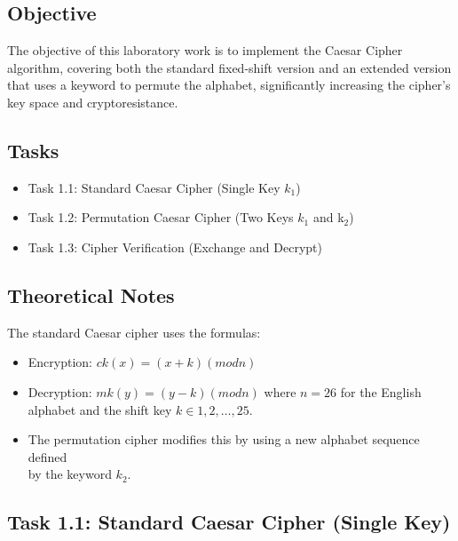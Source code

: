 \documentclass[a4paper,12pt]{article}
\begin{document}
\subsection{Objective}
\label{sec:orgf6ae595}
The objective of this laboratory work is to implement the Caesar Cipher algorithm, covering both the standard fixed-shift version and an extended version that uses a keyword to permute the alphabet, significantly increasing the cipher's key space and cryptoresistance.
\subsection{Tasks}
\label{sec:orgddf626c}
\begin{itemize}
\item Task 1.1: Standard Caesar Cipher (Single Key \(k_{1}\))
\item Task 1.2: Permutation Caesar Cipher (Two Keys \(k_{1}\) and k\(_{2}\)​)
\item Task 1.3: Cipher Verification (Exchange and Decrypt)
\end{itemize}
\subsection{Theoretical Notes}
\label{sec:org790f330}
The standard Caesar cipher uses the formulas:
\begin{itemize}
\item Encryption: \(ck(x)=(x+k)(mod n)\)
\item Decryption: \(mk(y)=(y−k)(mod n)\) where \(n=26\) for the English alphabet and the shift key \(k \in{1,2,…,25}\).
\item The permutation cipher modifies this by using a new alphabet sequence defined \\
by the keyword \(k_{2}\).
\end{itemize}
\subsection{Task 1.1: Standard Caesar Cipher (Single Key)}
\label{sec:orgbc3873b}
\end{document}
